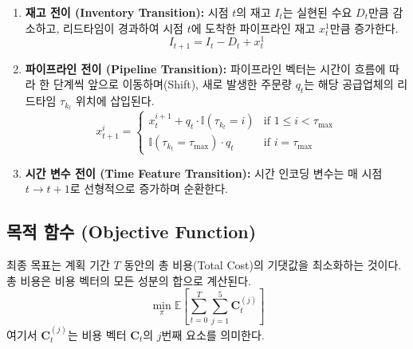 \documentclass[a4paper, 11pt]{article}
\begin{document}
\begin{enumerate}
    \item \textbf{재고 전이 (Inventory Transition):} 
    시점 $t$의 재고 $I_t$는 실현된 수요 $D_t$만큼 감소하고, 리드타임이 경과하여 시점 $t$에 도착한 파이프라인 재고 $x_t^1$만큼 증가한다.
    \begin{equation}
        I_{t+1} = I_t - D_t + x_t^1 \label{eq:inv_balance}
    \end{equation}

    \item \textbf{파이프라인 전이 (Pipeline Transition):} 
    파이프라인 벡터는 시간이 흐름에 따라 한 단계씩 앞으로 이동하며(Shift), 새로 발생한 주문량 $q_t$는 해당 공급업체의 리드타임 $\tau_{k_t}$ 위치에 삽입된다.
    \begin{equation}
         x_{t+1}^i = 
        \begin{cases} 
        x_{t}^{i+1} + q_t \cdot \mathbb{I}(\tau_{k_t} = i) & \text{if } 1 \le i < \tau_{\max} \\
        \mathbb{I}(\tau_{k_t} = \tau_{\max}) \cdot q_t & \text{if } i = \tau_{\max}
        \end{cases} \label{eq:pipeline_update}
    \end{equation}
    
    \item \textbf{시간 변수 전이 (Time Feature Transition):} 
    시간 인코딩 변수는 매 시점 $t \to t+1$로 선형적으로 증가하며 순환한다.
\end{enumerate}

\subsection{목적 함수 (Objective Function)}
최종 목표는 계획 기간 $T$ 동안의 총 비용(Total Cost)의 기댓값을 최소화하는 것이다. 총 비용은 비용 벡터의 모든 성분의 합으로 계산된다.
\begin{equation}
    \min_{\pi} \mathbb{E} \left[ \sum_{t=0}^{T} \sum_{j=1}^{5} \mathbf{C}_t^{(j)} \right]
\end{equation}
여기서 $\mathbf{C}_t^{(j)}$는 비용 벡터 $\mathbf{C}_t$의 $j$번째 요소를 의미한다.
\end{document}
